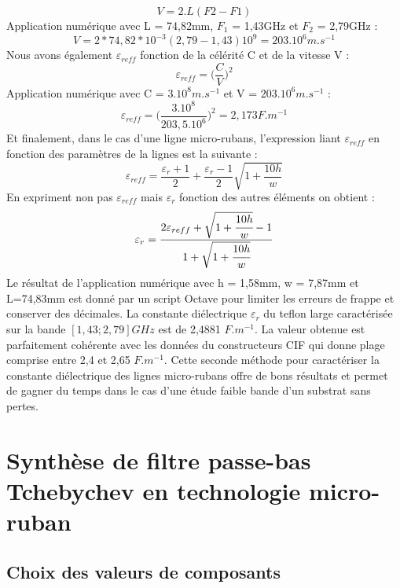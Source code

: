 \documentclass[french]{article}
\begin{document}
\begin{equation}
V=2.L(F2-F1) 
\end{equation}
Application numérique avec L = 74,82mm, $F_1$ = 1,43GHz et $F_2$ = 2,79GHz :
\begin{equation}
V= 2*74,82*10^{-3}(2,79-1,43)10^9=203.10^6m.s^{-1}
\end{equation}
Nous avons également $\varepsilon_{reff}$ fonction de la célérité C et de la vitesse V :
\begin{equation}
\varepsilon_{reff} = \Big(\frac{C}{V}\Big)^2
\end{equation}
Application numérique avec C = $3.10^8m.s^{-1}$ et V = $203.10^6m.s^{-1}$ :
\begin{equation}
\varepsilon_{reff} = \Big(\frac{3.10^8}{203,5.10^6}\Big)^2=2,173 F.m^{-1}
\end{equation}
Et finalement, dans le cas d'une ligne micro-rubans, l'expression liant $\varepsilon_{reff}$ en fonction des paramètres de la lignes est la suivante :
\begin{equation}
	\varepsilon_{reff} = \frac{\varepsilon_r+1}{2}+\frac{\varepsilon_r-1}{2}\sqrt{1+\frac{10h}{w}}
\end{equation}
En expriment non pas $\varepsilon_{reff}$ mais $\varepsilon_{r}$ fonction des autres éléments on obtient : 
\begin{equation}
\varepsilon_{r} = \frac{2\varepsilon_{reff} + \sqrt{1 + \cfrac{10h}{w}} - 1}{1 + \sqrt{1 + \cfrac{10h}{w}}}
\end{equation}
Le résultat de l'application numérique avec h = 1,58mm, w = 7,87mm et L=74,83mm est donné par un script Octave pour limiter les erreurs de frappe et conserver des décimales. La constante diélectrique $\varepsilon_{r}$ du teflon large caractérisée sur la bande $[1,43;2,79]GHz$ est de 2,4881 $F.m^{-1}$. La valeur obtenue est parfaitement cohérente avec les données du constructeurs CIF qui donne plage comprise entre 2,4 et 2,65 $F.m^{-1}$. Cette seconde méthode pour caractériser la constante diélectrique des lignes micro-rubans offre de bons résultats et permet de gagner du temps dans le cas d'une étude faible bande d'un substrat sans pertes.



\section{Synthèse de filtre passe-bas Tchebychev en technologie micro-ruban}

\subsection{Choix des valeurs de composants}
\end{document}
